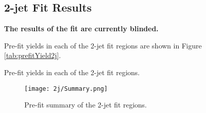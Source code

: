 


\subsection{2-jet Fit Results}

\textbf{The results of the fit are currently blinded.} 

Pre-fit yields in each of the 2-jet fit regions are shown in Figure \ref{tab:prefitYield2j}.

\begin{table}[H]
\begin{adjustwidth}{-3em}{-3em}

\label{tab:prefitYield2j}
\caption{Pre-fit yields in each of the 2-jet fit regions.}                                     
\end{adjustwidth}
\end{table}

\begin{figure}[H]
  \center                                                                                                                    
  \texttt{[image: 2j/Summary.png]}
  \caption{Pre-fit summary of the 2-jet fit regions.}                                                                        
  \label{fig:prefitSummary_2j}
\end{figure}

